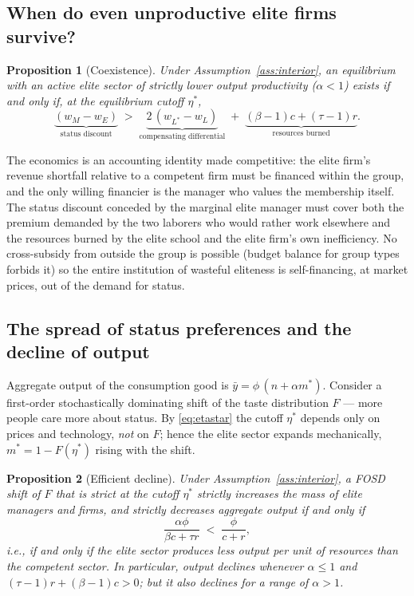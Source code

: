 \documentclass[12pt,letterpaper]{article}
\newtheorem{proposition}{Proposition}
\theoremstyle{definition}
\begin{document}
\subsection{When do even unproductive elite firms survive?}

\begin{proposition}[Coexistence]\label{prop:coexist} Under Assumption~\ref{ass:interior}, an equilibrium with an active elite sector of strictly lower output productivity ($\alpha<1$) exists if and only if, at the equilibrium cutoff $\eta^\ast$,
\begin{equation}\label{eq:coexist}
  \underbrace{(w_M - w_E)}_{\text{status discount}}
  \;>\;
  \underbrace{2\,(w_{L^\ast} - w_L)}_{\text{compensating differential}}
  \;+\;
  \underbrace{(\beta-1)c + (\tau-1)r}_{\text{resources burned}} .
\end{equation}
\end{proposition}

The economics is an accounting identity made competitive: the elite firm's revenue shortfall relative to a competent firm must be financed within the group, and the only willing financier is the manager who values the membership itself.
The status discount conceded by the marginal elite manager must cover both the premium demanded by the two laborers who would rather work elsewhere and the resources burned by the elite school and the elite firm's own inefficiency.
No cross-subsidy from outside the group is possible (budget balance for group types forbids it) so the entire institution of wasteful eliteness is self-financing, at market prices, out of the demand for status.

\subsection{The spread of status preferences and the decline of output}

Aggregate output of the consumption good is $\bar{y}=\phi\,(n+\alpha m^\ast)$.
Consider a first-order stochastically dominating shift of the taste distribution $F$ --- more people care more about status.
By \eqref{eq:etastar} the cutoff $\eta^\ast$ depends only on prices and technology, \emph{not} on $F$; hence the elite sector expands mechanically, $m^\ast = 1-F(\eta^\ast)$ rising with the shift.

\begin{proposition}[Efficient decline]\label{prop:decline} Under Assumption~\ref{ass:interior}, a FOSD shift of $F$ that is strict at the cutoff $\eta^\ast$ strictly increases the mass of elite managers and firms, and strictly decreases aggregate output if and only if
\begin{equation}\label{eq:decline}
  \frac{\alpha\phi}{\beta c + \tau r} \;<\; \frac{\phi}{c+r},
\end{equation}
i.e., if and only if the elite sector produces less output per unit of resources than the competent sector.
In particular, output declines whenever $\alpha\leq 1$ and $(\tau-1)r+(\beta-1)c>0$; but it also declines for a range of $\alpha>1$.
\end{proposition}
\end{document}
